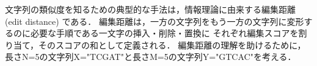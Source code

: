 文字列の類似度を知るための典型的な手法は，情報理論に由来する編集距離 (edit distance) である．
編集距離は，一方の文字列をもう一方の文字列に変形するのに必要な手順である一文字の挿入・削除・置換に
それぞれ編集スコアを割り当て，そのスコアの和として定義される．
編集距離の理解を助けるために，長さN=5の文字列X="TCGAT"と長さM=5の文字列Y="GTCAC"を考える．
\begin{figure}[t!]
\begin{center}
\\
\\
\subfigure[]{
}
\end{center}
\end{figure}
